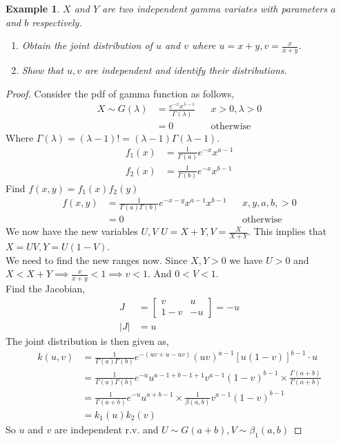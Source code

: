 \documentclass[oneside,11pt,pdftex]{book}%
\numberwithin{equation}{section}
\newtheorem{example}[theorem]{Example}
\numberwithin{section}{chapter}
\numberwithin{equation}{chapter}
\begin{document}
\begin{example}
	$ X $ and $ Y $ are two independent gamma variates with parameters $ a $ and $ b $ respectively.
	\begin{enumerate}
		\item Obtain the joint distribution of $ u $ and $ v $ where $ u=x+y, v= \frac{x}{x+y} $.
		\item Show that $ u, v $ are independent and identify their distributions.
	\end{enumerate}
\end{example}
\begin{proof}
	Consider the pdf of gamma function as follows,
	\begin{align*}
		X\sim G(\lambda)&= \frac{e^{-x} x^{\lambda -1}}{\Gamma (\lambda )} && x>0, \lambda >0\\
		&=0 && \text{otherwise}
	\end{align*}
	Where $ \Gamma (\lambda)=(\lambda-1)!=(\lambda-1)\Gamma (\lambda -1) $.\\
	\begin{align*}
		f_1(x)&=\frac{1}{\Gamma (a)}e^{-x}x^{a-1}\\
		f_2(x)&=\frac{1}{\Gamma (b)}e^{-x}x^{b-1}
	\end{align*}
	Find $ f(x,y)=f_1(x)f_2(y) $
		\begin{align*}
			f(x,y)&=\frac{1}{\Gamma(a)\Gamma(b)}e^{-x-y}x^{a-1}x^{b-1} && x,y,a,b,>0\\
			&= 0 && \text{otherwise}
		\end{align*}		
	We now have the new variables $ U,V $
	$ U=X+Y, V=\frac{X}{X+Y} $. This implies that $ X=UV, Y=U(1-V)$.\\
	We need to find the new ranges now. Since $ X,Y>0 $ we have $ U>0 $ and $ X<X+Y \implies \frac{x}{x+y}<1 \implies v<1 $. And $ 0<V<1 $.\\
	
	Find the Jacobian,
	\begin{align*}
		J&=\begin{bmatrix}
			v & u\\
			1-v & -u
		\end{bmatrix}=-u\\
	|J|&=u
	\end{align*}
	The joint distribution is then given as,
	\begin{align*}
			k(u,v)&=\frac{1}{\Gamma(a)\Gamma(b)}e^{-(uv+u-uv)}(uv)^{a-1}[u(1-v)]^{b-1} \cdot u\\
			&=\frac{1}{\Gamma(a)\Gamma(b)}e^{-u}u^{a-1+b-1+1} v^{a-1} (1-v)^{b-1} \times \frac{\Gamma(a+b)}{\Gamma(a+b)}\\
			&= \frac{1}{\Gamma(a+b)}e^{-u}u^{a+b-1} \times \frac{1}{\beta(a,b)}v^{a-1}(1-v)^{b-1}\\
			&=k_1(u)k_2(v)
	\end{align*}
So $ u $ and $ v $ are independent r.v. and $ U \sim G(a+b), V \sim \beta_1(a,b) $
\end{proof}
\end{document}
